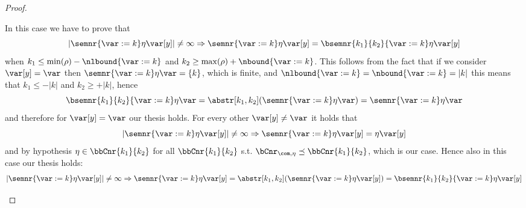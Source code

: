 \begin{proof}
\begin{inductive}
     In this case we have to prove that
    \[{|\semnr{\var := k}\eta\var[y]| \neq \infty} \Rightarrow
      {\semnr{\var := k}\eta\var[y]} = {\bsemnr{k_1}{k_2}{\var :=
          k}\eta\var[y]}\] when
    \(k_1 \leq \min(\rho) - \nlbound{\var := k}\) and
    \(k_2 \geq \max(\rho) + \nbound{\var := k}\). This follows from
    the fact that if we consider \(\var[y] = \var\) then
    \(\semnr{\var := k}\eta\var = \{k\}\), which is finite, and
    \(\nlbound{\var := k} = \nbound{\var := k} = |k|\) this means that
    \(k_1 \leq -|k|\) and \(k_2 \geq +|k|\), hence
    \begin{equation*}
      {\bsemnr{k_1}{k_2}{\var := k}\eta\var} = \abstr[k_1,k_2]({\semnr{\var := k}\eta\var}) = {\semnr{\var := k}\eta\var}
    \end{equation*}
    and therefore for \(\var[y] = \var\) our thesis holds. For every
    other \(\var[y] \neq \var\) it holds that
    \begin{equation*}
      |\semnr{\var := k}\eta\var[y]| \neq \infty
      \Rightarrow
      \semnr{\var := k}\eta\var[y] = \eta\var[y]
    \end{equation*}
    and by hypothesis \(\eta \in \bbCnr{k_1}{k_2}\) for all
    \(\bbCnr{k_1}{k_2}\) s.t.
    \(\bCnr_{\com, \eta} \preceq \bbCnr{k_1}{k_2}\), which is our
    case. Hence also in this case our thesis holds:
    \begin{equation*}
      |\semnr{\var := k}\eta\var[y]| \neq \infty
      \Rightarrow
      \semnr{\var := k}\eta\var[y] =
      \abstr[k_1,k_2]({\semnr{\var := k}\eta\var[y]}) =
      {\bsemnr{k_1}{k_2}{\var := k}\eta\var[y]}
    \end{equation*}


\end{inductive}
\end{proof}
